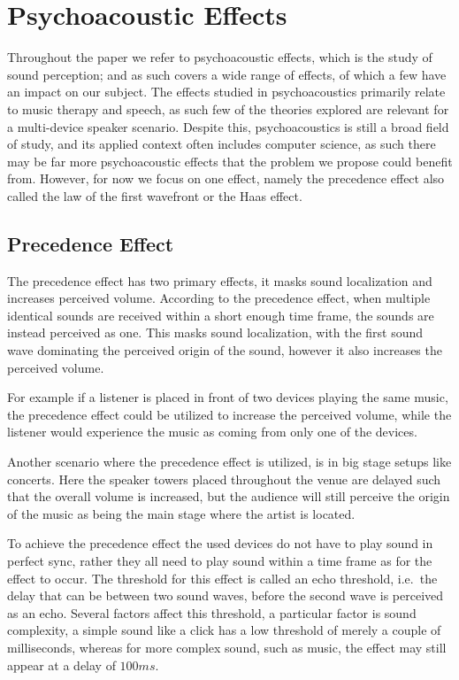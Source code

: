 \section{Psychoacoustic Effects}\label{sec:psychoacoustic_effects}
Throughout the paper we refer to psychoacoustic effects, which is the study of sound perception;
and as such covers a wide range of effects, of which a few have an impact on our subject.
The effects studied in psychoacoustics primarily relate to music therapy and speech, as such few of the theories explored are relevant for a multi-device speaker scenario.
Despite this, psychoacoustics is still a broad field of study, and its applied context often includes computer science, as such there may be far more psychoacoustic effects that the problem we propose could benefit from.
However, for now we focus on one effect, namely the precedence effect also called the law of the first wavefront or the Haas effect.

\subsection{Precedence Effect}
The precedence effect has two primary effects, it masks sound localization and increases perceived volume.
According to the precedence effect, when multiple identical sounds are received within a short enough time frame, the sounds are instead perceived as one.
This masks sound localization, with the first sound wave dominating the perceived origin of the sound, however it also increases the perceived volume.

For example if a listener is placed in front of two devices playing the same music, the precedence effect could be utilized to increase the perceived volume, while the listener would experience the music as coming from only one of the devices.

Another scenario where the precedence effect is utilized, is in big stage setups like concerts.
Here the speaker towers placed throughout the venue are delayed such that the overall volume is increased, but the audience will still perceive the origin of the music as being the main stage where the artist is located.

\bigskip
To achieve the precedence effect the used devices do not have to play sound in perfect sync, rather they all need to play sound within a time frame as for the effect to occur.
The threshold for this effect is called an echo threshold, i.e.\ the delay that can be between two sound waves, before the second wave is perceived as an echo.
Several factors affect this threshold, a particular factor is sound complexity, a simple sound like a click has a low threshold of merely a couple of milliseconds, whereas for more complex sound, such as music, the effect may still appear at a delay of $100 ms$.\cite{precedence_wiki}

